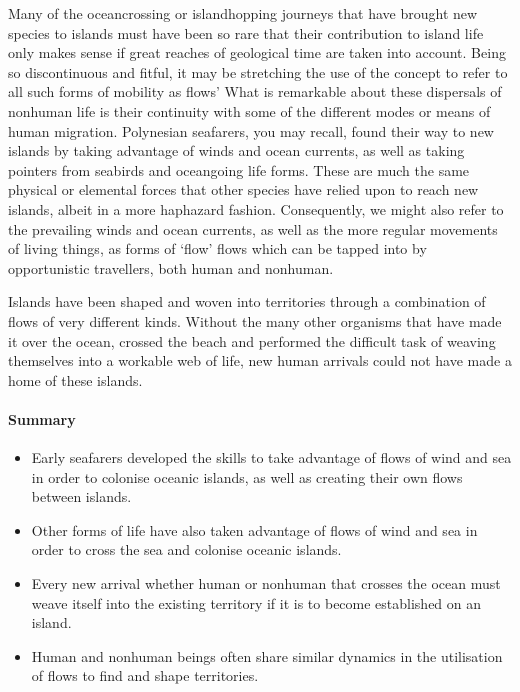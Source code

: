\documentclass[letterpaper,10pt,english]{sphinxmanual}
\begin{document}
Many of the ocean\sphinxhyphen{}crossing or island\sphinxhyphen{}hopping journeys that have brought new species to islands must have been so rare that their contribution to island life only makes sense if great reaches of geological time are taken into account. Being so discontinuous and fitful, it may be stretching the use of the concept to refer to all such forms of mobility as flows’ What is remarkable about these dispersals of non\sphinxhyphen{}human life is their continuity with some of the different modes or means of human
migration. Polynesian seafarers, you may recall, found their way to new islands by taking advantage of winds and ocean currents, as well as taking pointers from seabirds and ocean\sphinxhyphen{}going life forms. These are much the same physical or elemental forces that other species have relied upon to reach new islands, albeit in a more haphazard fashion. Consequently, we might also refer to the prevailing winds and ocean currents, as well as the more regular movements of living things, as forms of ‘flow’ \textendash{}
flows which can be tapped into by opportunistic travellers, both human and non\sphinxhyphen{}human.

Islands have been shaped and woven into territories through a combination of flows of very different kinds. Without the many other organisms that have made it over the ocean, crossed the beach and performed the difficult task of weaving themselves into a workable web of life, new human arrivals could not have made a home of these islands.


\paragraph{Summary}
\label{\detokenize{content/session_00/Part_00_03:Summary}}\begin{itemize}
\item {} 
Early seafarers developed the skills to take advantage of flows of wind and sea in order to colonise oceanic islands, as well as creating their own flows between islands.

\item {} 
Other forms of life have also taken advantage of flows of wind and sea in order to cross the sea and colonise oceanic islands.

\item {} 
Every new arrival \textendash{} whether human or non\sphinxhyphen{}human \textendash{} that crosses the ocean must weave itself into the existing territory if it is to become established on an island.

\item {} 
Human and non\sphinxhyphen{}human beings often share similar dynamics in the utilisation of flows to find and shape territories.

\end{itemize}
\end{document}
